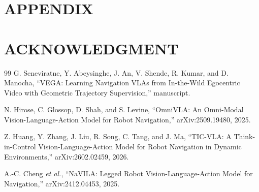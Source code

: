 \documentclass[letterpaper, 10 pt, conference]{ieeeconf}  %
\newif\ifincludesupplementary
\begin{document}

\balance







\section*{APPENDIX}


\section*{ACKNOWLEDGMENT}





\begin{thebibliography}{99}
    G. Seneviratne, Y. Abeysinghe, J. An, V. Shende, R. Kumar, and
    D. Manocha, ``VEGA: Learning Navigation VLAs from In-the-Wild
    Egocentric Video with Geometric Trajectory Supervision,'' manuscript.

    N. Hirose, C. Glossop, D. Shah, and S. Levine,
    ``OmniVLA: An Omni-Modal Vision-Language-Action Model for Robot
    Navigation,'' arXiv:2509.19480, 2025.

    Z. Huang, Y. Zhang, J. Liu, R. Song, C. Tang, and J. Ma,
    ``TIC-VLA: A Think-in-Control Vision-Language-Action Model for Robot
    Navigation in Dynamic Environments,'' arXiv:2602.02459, 2026.

    A.-C. Cheng \emph{et al.}, ``NaVILA: Legged Robot
    Vision-Language-Action Model for Navigation,'' arXiv:2412.04453, 2025.

\end{thebibliography}




\ifincludesupplementary
  \clearpage
  \nobalance
  \onecolumn
  
\fi
\end{document}
